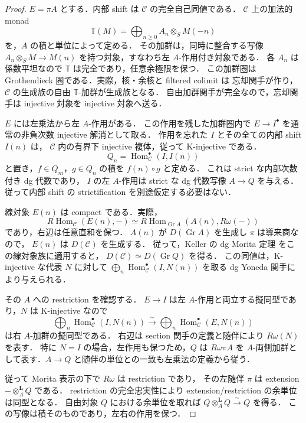 \begin{proof}
$E=\pi A$ とする．内部 shift は $\mathcal C$ の完全自己同値である．
$\mathcal C$ 上の加法的 monad
\[
 \mathbb T(M)=\bigoplus_{n\geq0}A_n\otimes_SM(-n)
\]
を，$A$ の積と単位によって定める．
その加群は，同時に整合する写像
$A_n\otimes_SM\to M(n)$ を持つ対象，すなわち左 $A$-作用付き対象である．
各 $A_n$ は係数平坦なので $\mathbb T$ は完全であり，任意余極限を保つ．
この加群圏は Grothendieck 圏である．実際，核・余核と filtered colimit は
忘却関手が作り，$\mathcal C$ の生成族の自由 $\mathbb T$-加群が生成族となる．
自由加群関手が完全なので，忘却関手は injective 対象を injective 対象へ送る．

$E$ には左乗法から左 $A$-作用がある．
この作用を残した加群圏内で $E\to I^\bullet$ を通常の非負次数 injective 解消として取る．
作用を忘れた $I$ とその全ての内部 shift $I(n)$ は，
$\mathcal C$ 内の有界下 injective 複体，従って K-injective である．
\[
 Q_n=\operatorname{Hom}^{\bullet}_{\mathcal C}(I,I(n))
\]
と置き，$f\in Q_m$，$g\in Q_n$ の積を
$f(n)\circ g$ と定める．
これは strict な内部次数付き dg 代数であり，
$I$ の左 $A$-作用は strict な dg 代数写像 $A\to Q$ を与える．
従って内部 shift の strictification を別途仮定する必要はない．

線対象 $E(n)$ は compact である．実際，
\[
 R\operatorname{Hom}_{\mathcal C}(E(n),-)
 \simeq R\operatorname{Hom}_{\operatorname{Gr}A}(A(n),R\omega(-))
\]
であり，右辺は任意直和を保つ．
$A(n)$ が $D(\operatorname{Gr}A)$ を生成し $\pi$ は導来商なので，
$E(n)$ は $D(\mathcal C)$ を生成する．
従って，Keller の dg Morita 定理
\cite[Theorem~3.8(c), \S3.8]{KellerDgCategories}
をこの線対象族に適用すると，
$D(\mathcal C)\simeq D(\operatorname{Gr}Q)$ を得る．
この同値は，K-injective な代表 $N$ に対して
$\bigoplus_n\operatorname{Hom}^{\bullet}_{\mathcal C}(I,N(n))$
を取る dg Yoneda 関手により与えられる．

その $A$ への restriction を確認する．
$E\to I$ は左 $A$-作用と両立する擬同型であり，$N$ は K-injective なので
\[
 \bigoplus_n\operatorname{Hom}^{\bullet}_{\mathcal C}(I,N(n))
 \xrightarrow{\sim}
 \bigoplus_n\operatorname{Hom}^{\bullet}_{\mathcal C}(E,N(n))
\]
は右 $A$-加群の擬同型である．
右辺は section 関手の定義と随伴により $R\omega(N)$ を表す．
特に $N=I$ の場合，左作用も保つため，$Q$ は $R\omega\pi A$ を
$A$-両側加群として表す．$A\to Q$ と随伴の単位との一致も左乗法の定義から従う．

従って Morita 表示の下で $R\omega$ は restriction であり，
その左随伴 $\pi$ は extension $-\otimes_A^{\mathbf L}Q$ である．
restriction の完全忠実性により extension/restriction の余単位は同型となる．
自由対象 $Q$ における余単位を取れば
$Q\otimes_A^{\mathbf L}Q\xrightarrow{\sim}Q$ を得る．
この写像は積そのものであり，左右の作用を保つ．
\end{proof}

